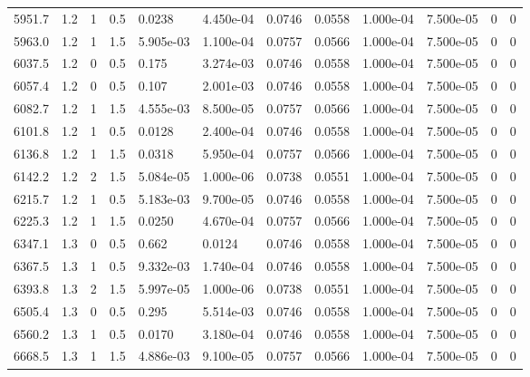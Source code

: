 \documentclass[preview]{standalone}
\begin{document}
{{{\begin{tabular}{L{1.2cm}C{1.2cm} C{0.3cm}C{0.5cm} C{1.4cm}C{1.4cm} C{1.4cm}C{1.4cm} C{1.6cm}C{1.6cm} C{1.6cm}C{1.6cm}}
  5951.7  &   1.2  & 1     & 0.5 &  0.0238  & 4.450e-04  &  0.0746&   0.0558& 1.000e-04 & 7.500e-05   &  0 & 0  \\ 
  5963.0  &   1.2  & 1     & 1.5 &  5.905e-03  & 1.100e-04  &  0.0757&   0.0566& 1.000e-04 & 7.500e-05   &  0 & 0  \\ 
  6037.5  &   1.2  & 0     & 0.5 &  0.175  & 3.274e-03  &  0.0746&   0.0558& 1.000e-04 & 7.500e-05   &  0 & 0  \\ 
  6057.4  &   1.2  & 0     & 0.5 &  0.107  & 2.001e-03  &  0.0746&   0.0558& 1.000e-04 & 7.500e-05   &  0 & 0  \\ 
  6082.7  &   1.2  & 1     & 1.5 &  4.555e-03  & 8.500e-05  &  0.0757&   0.0566& 1.000e-04 & 7.500e-05   &  0 & 0  \\ 
  6101.8  &   1.2  & 1     & 0.5 &  0.0128  & 2.400e-04  &  0.0746&   0.0558& 1.000e-04 & 7.500e-05   &  0 & 0  \\ 
  6136.8  &   1.2  & 1     & 1.5 &  0.0318  & 5.950e-04  &  0.0757&   0.0566& 1.000e-04 & 7.500e-05   &  0 & 0  \\ 
  6142.2  &   1.2  & 2     & 1.5 &  5.084e-05  & 1.000e-06  &  0.0738&   0.0551& 1.000e-04 & 7.500e-05   &  0 & 0  \\ 
  6215.7  &   1.2  & 1     & 0.5 &  5.183e-03  & 9.700e-05  &  0.0746&   0.0558& 1.000e-04 & 7.500e-05   &  0 & 0  \\ 
  6225.3  &   1.2  & 1     & 1.5 &  0.0250  & 4.670e-04  &  0.0757&   0.0566& 1.000e-04 & 7.500e-05   &  0 & 0  \\ 
  6347.1  &   1.3  & 0     & 0.5 &  0.662  & 0.0124  &  0.0746&   0.0558& 1.000e-04 & 7.500e-05   &  0 & 0  \\ 
  6367.5  &   1.3  & 1     & 0.5 &  9.332e-03  & 1.740e-04  &  0.0746&   0.0558& 1.000e-04 & 7.500e-05   &  0 & 0  \\ 
  6393.8  &   1.3  & 2     & 1.5 &  5.997e-05  & 1.000e-06  &  0.0738&   0.0551& 1.000e-04 & 7.500e-05   &  0 & 0  \\ 
  6505.4  &   1.3  & 0     & 0.5 &  0.295  & 5.514e-03  &  0.0746&   0.0558& 1.000e-04 & 7.500e-05   &  0 & 0  \\ 
  6560.2  &   1.3  & 1     & 0.5 &  0.0170  & 3.180e-04  &  0.0746&   0.0558& 1.000e-04 & 7.500e-05   &  0 & 0  \\ 
  6668.5  &   1.3  & 1     & 1.5 &  4.886e-03  & 9.100e-05  &  0.0757&   0.0566& 1.000e-04 & 7.500e-05   &  0 & 0  \\ 
\hline 
\end{tabular} 

}}}
\end{document}
